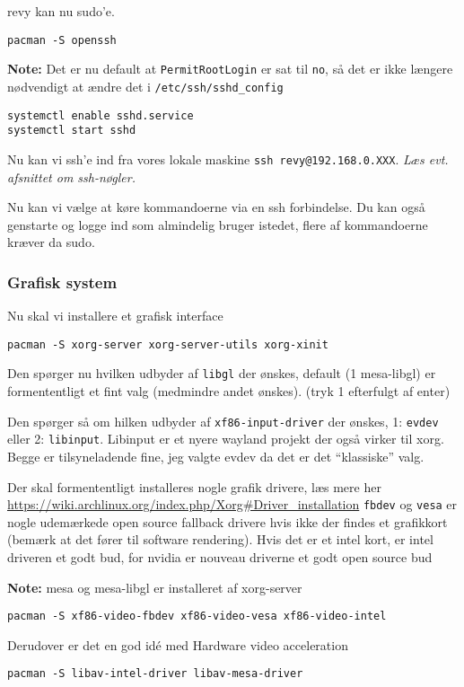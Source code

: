 \documentclass[10pt,a4paper,danish]{article}
\newcommand{\note}[1]{\begin{mdframed}[style=note]\textbf{Note:}
    #1\end{mdframed}}
\newcommand{\code}[1]{\colorbox{verbgray}{\texttt{#1}}}
\begin{document}
revy kan nu sudo'e.

\begin{verbatim}
pacman -S openssh
\end{verbatim}
\note{Det er nu default at \texttt{PermitRootLogin} er sat til \texttt{no}, så
  det er ikke længere nødvendigt at ændre det i \texttt{/etc/ssh/sshd\_config}}
\begin{verbatim}
systemctl enable sshd.service
systemctl start sshd
\end{verbatim}
Nu kan vi ssh'e ind fra vores lokale maskine \code{ssh revy@192.168.0.XXX}.
\textit{Læs evt. afsnittet om ssh-nøgler.}

Nu kan vi vælge at køre kommandoerne via en ssh forbindelse.
Du kan også genstarte og logge ind som almindelig bruger istedet, flere af
kommandoerne kræver da sudo.

\subsubsection{Grafisk system}
Nu skal vi installere et grafisk interface
\begin{verbatim}
pacman -S xorg-server xorg-server-utils xorg-xinit
\end{verbatim}
Den spørger nu hvilken udbyder af \texttt{libgl} der ønskes, default (1
mesa-libgl) er formententligt et fint valg (medmindre andet ønskes). (tryk 1
efterfulgt af enter)

Den spørger så om hilken udbyder af \texttt{xf86-input-driver} der ønskes,
1: \texttt{evdev} eller 2: \texttt{libinput}. Libinput er et nyere wayland projekt der
også virker til xorg. Begge er tilsyneladende fine, jeg valgte evdev da det er
det ``klassiske'' valg.

Der skal formententligt installeres nogle grafik drivere, læs mere her \url{https://wiki.archlinux.org/index.php/Xorg#Driver_installation}
\texttt{fbdev} og \texttt{vesa} er nogle udemærkede open source fallback drivere hvis
ikke der findes et grafikkort (bemærk at det fører til software rendering).
Hvis det er et intel kort, er intel driveren et godt bud, for nvidia er nouveau
driverne et godt open source bud

\note{mesa og mesa-libgl er installeret af xorg-server}
\begin{verbatim}
pacman -S xf86-video-fbdev xf86-video-vesa xf86-video-intel
\end{verbatim}
Derudover er det en god idé med Hardware video acceleration
\begin{verbatim}
pacman -S libav-intel-driver libav-mesa-driver
\end{verbatim}
\end{document}
